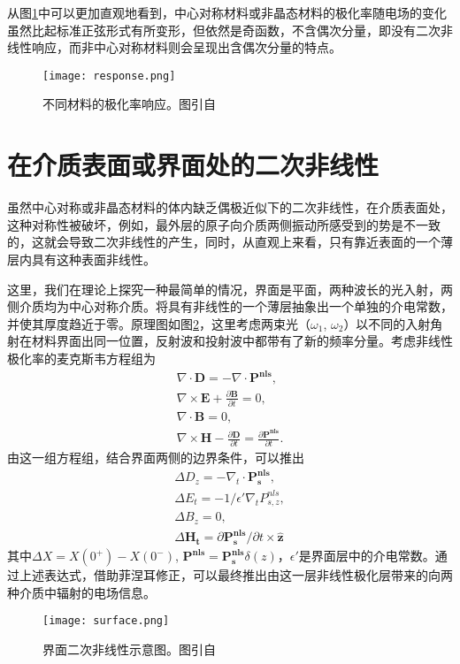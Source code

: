 从图\ref{pic:response}中可以更加直观地看到，中心对称材料或非晶态材料的极化率随电场的变化虽然比起标准正弦形式有所变形，但依然是奇函数，不含偶次分量，即没有二次非线性响应，而非中心对称材料则会呈现出含偶次分量的特点。

\begin{figure}
\centering
\texttt{[image: response.png]}
\caption{不同材料的极化率响应。图引自\cite{boyd2003nonlinear}}
\label{pic:response}
\end{figure}

\section{在介质表面或界面处的二次非线性}
虽然中心对称或非晶态材料的体内缺乏偶极近似下的二次非线性，在介质表面处，这种对称性被破坏，例如，最外层的原子向介质两侧振动所感受到的势是不一致的，这就会导致二次非线性的产生，同时，从直观上来看，只有靠近表面的一个薄层内具有这种表面非线性。

这里，我们在理论上探究一种最简单的情况，界面是平面，两种波长的光入射，两侧介质均为中心对称介质。将具有非线性的一个薄层抽象出一个单独的介电常数，并使其厚度趋近于零。原理图如图\ref{pic:surface}，这里考虑两束光（$\omega_1$, $\omega_2$）以不同的入射角射在材料界面出同一位置，反射波和投射波中都带有了新的频率分量。考虑非线性极化率的麦克斯韦方程组为
\begin{gather}
\nabla \cdot \mathbf{D}  = -\nabla \cdot \mathbf{P^{nls}} , \\
\nabla \times \mathbf{E }	+ \frac{\partial\mathbf{B} }{\partial t} = 0, \\
\nabla \cdot \mathbf{B} = 0, \\
\nabla \times \mathbf{H} - \frac{\partial \mathbf{D}}{\partial t} = \frac{\partial \mathbf{P^{nls}}}{\partial t}.
\end{gather}
由这一组方程组，结合界面两侧的边界条件，可以推出\cite{heinz1991second}
\begin{gather}
\Delta D_z = -\nabla_t \cdot \mathbf{P_s^{nls}}, \\
\Delta E_t = -1/\epsilon' \nabla_t P_{s,z}^{nls}, \\
\Delta B_z = 0, \\
\Delta \mathbf{H_t} = \partial \mathbf{P_s^{nls}}/\partial t \times \mathbf{\hat z} 
\end{gather}
其中$\Delta X = X(0^+)-X(0^-)$, $\mathbf{P^{nls}}  = \mathbf{P_s^{nls}}\delta(z)$，$\epsilon'$是界面层中的介电常数。通过上述表达式，借助菲涅耳修正，可以最终推出由这一层非线性极化层带来的向两种介质中辐射的电场信息\cite{heinz1991second}。
\begin{figure}
\centering
\texttt{[image: surface.png]}
\caption{界面二次非线性示意图。图引自\cite{heinz1991second}}
\label{pic:surface}
\end{figure}

